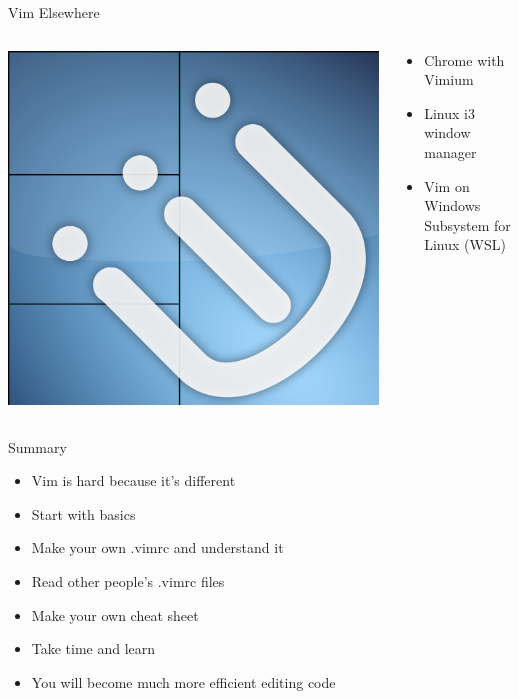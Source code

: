 \documentclass{beamer}
\begin{document}
\begin{frame}{Vim Elsewhere}
    \begin{columns}
        \begin{column}{0.4\textwidth}
            \begin{center}
                \includegraphics[width=1\textwidth]{images/i3wm-logo.png}
            \end{center}
        \end{column}
        \begin{column}{0.6\textwidth}
            \begin{itemize}
                \item Chrome with Vimium
                \item Linux i3 window manager
                \item Vim on Windows Subsystem for Linux (WSL)
            \end{itemize}
        \end{column}
    \end{columns}
\end{frame}

\begin{frame}{Summary}
    \begin{itemize}
        \item Vim is hard because it's different
        \item Start with basics
        \item Make your own .vimrc and understand it
        \item Read other people's .vimrc files
        \item Make your own cheat sheet
        \item Take time and learn
        \item You will become much more efficient editing code
    \end{itemize}
\end{frame}
\end{document}
